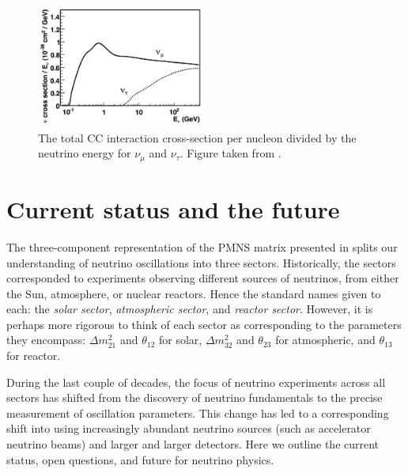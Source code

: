 \begin{figure} %
    \includegraphics[origin=c,width=0.5\textwidth]{diagrams/3-theory/tau_comparison.pdf}
    \caption[The total charged-current cross-section of $\nu_{\mu}$ and $\nu_{\tau}$]
    {The total CC interaction cross-section per nucleon divided by the neutrino energy for
        $\nu_{\mu}$ and $\nu_{\tau}$. Figure taken from .}
    \label{fig:tau_comparison}
\end{figure}

\section{Current status and the future} %
\label{sec:theory_status} %

The three-component representation of the PMNS matrix presented in  splits
our understanding of neutrino oscillations into three sectors. Historically, the sectors
corresponded to experiments observing different sources of neutrinos, from either the Sun,
atmosphere, or nuclear reactors. Hence the standard names given to each: the \emph{solar sector},
\emph{atmospheric sector}, and \emph{reactor sector}. However, it is perhaps more rigorous to
think of each sector as corresponding to the parameters they encompass: $\Delta m^{2}_{21}$ and
$\theta_{12}$ for solar, $\Delta m^{2}_{32}$ and $\theta_{23}$ for atmospheric, and $\theta_{13}$
for reactor.

During the last couple of decades, the focus of neutrino experiments across all sectors has
shifted from the discovery of neutrino fundamentals to the precise measurement of oscillation
parameters. This change has led to a corresponding shift into using increasingly abundant neutrino
sources (such as accelerator neutrino beams) and larger and larger detectors. Here we outline the
current status, open questions, and future for neutrino physics.

